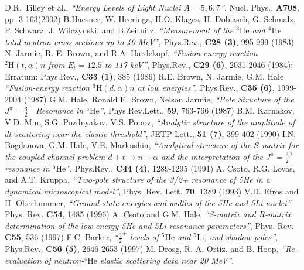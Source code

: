 \documentclass[12pt]{article}
\begin{document}
\begin{thebibliography}{99}
        D.R. Tilley et al.,
        {\it ``Energy Levels of Light Nuclei $A =5,6,7$''},
        Nucl. Phys., {\bf A708}, pp. 3-163(2002)
    B.Haesner, W. Heeringa, H.O. Klages, H. Dobiasch, G. Schmalz, P. Schwarz, J. Wilczynski, and B.Zeitnitz,
    {\it``Measurement of the ${}^3\mathrm{He}$ and ${}^4\mathrm{He}$ total neutron cross sections up to 40 MeV''},
    Phys.Rev., {\bf C28 (3)}, 995-999 (1983)
    N. Jarmie, R. E. Brown, and R.A. Hardekopf,
    {\it``Fusion-energy reaction ${}^2\mathrm{H}(t,\alpha)n$ from $E_t=12.5$ to 117 keV''},
    Phys.Rev., {\bf C29 (6)}, 2031-2046 (1984);
    Erratum: Phys.Rev., {\bf C33 (1)}, 385 (1986)
        R.E. Brown, N. Jarmie, G.M. Hale
        {\it``Fusion-energy reaction ${}^3\mathrm{H}(d,\alpha)n$ at low
        energies''},
        Phys.Rev., {\bf C35 (6)}, 1999-2004 (1987)
	G.M. Hale, Ronald E. Brown, Nelson Jarmie,
	{\it ``Pole Structure of the $J^\pi=\frac32^+$ Resonance
      in ${}^5\mathrm{He}$''},
	Phys.Rev.Lett., {\bf 59}, 763-766 (1987)
	  B.M. Karnakov, V.D. Mur, S.G. Pozdnyakov, V.S. Popov,
	  {\it``Analytic structure of the amplitude of $dt$ scattering near the
         elastic threshold''},
        JETP Lett., {\bf 51 (7)}, 399-402 (1990)
        I.N. Bogdanova, G.M. Hale, V.E. Markushin,
        {\it``Analytical structure of the $S$ matrix for the coupled channel
        problem $d+t\to n+\alpha$ and the interpretation of the
        $J^\pi=\frac32^+$ resonance in ${}^5\mathrm{He}$''},
        Phys.Rev., {\bf C44 (4)}, 1289-1295 (1991)
    A. Csoto, R.G. Lovas, and A.T. Kruppa,
    {\it ``Two-pole structure of the 3/2+ resonance of 5He in a dynamical microscopical model''},
    Phys. Rev. Lett. {\bf 70}, 1389 (1993)
    V.D. Efros and H. Oberhummer,
    {\it ``Ground-state energies and widths of the 5He and 5Li nuclei''},
    Phys. Rev. {\bf C54}, 1485 (1996)
    A. Csoto and G.M. Hale,
    {\it ``S-matrix and R-matrix determination of the low-energy 5He and 5Li resonance parameters''},
    Phys. Rev. {\bf C55}, 536 (1997)
   F.C. Barker,
   {\it ``${\frac32}^+$ levels of ${}^5\mathrm{He}$ and ${}^5\mathrm{Li}$, and shadow poles''},
    Phys.Rev., {\bf C56 (5)}, 2646-2653 (1997)
    M. Drosg, R. A. Ortiz, and B. Hoop,
    {\it``Re-evaluation of neutron-${}^4\mathrm{He}$ elastic scattering data near 20 MeV''},

\end{thebibliography}
\end{document}
